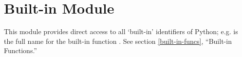 \section{Built-in Module }
\label{module-builtin}

This module provides direct access to all `built-in' identifiers of
Python; e.g.  is the full name for the built-in
function .  See section \ref{built-in-funcs}, ``Built-in
Functions.''
